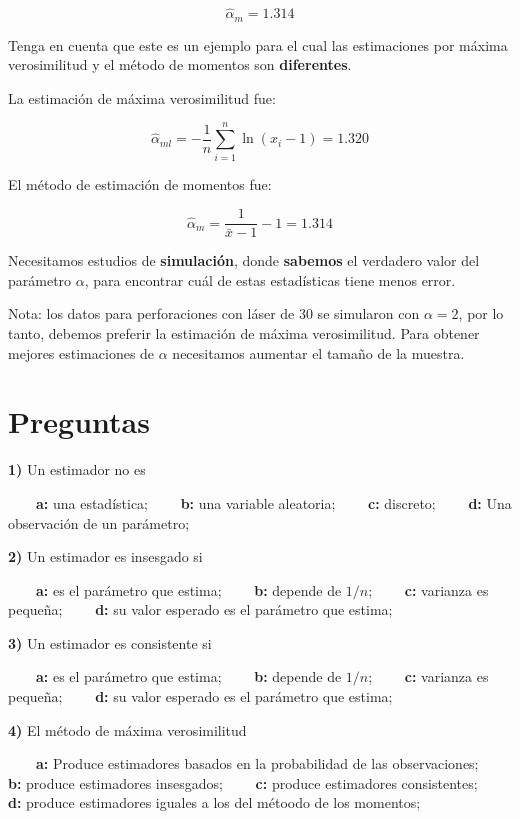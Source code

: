 \documentclass[
]{book}
\begin{document}
\[\hat{\alpha}_m=1.314\]

Tenga en cuenta que este es un ejemplo para el cual las estimaciones por máxima verosimilitud y el método de momentos son \textbf{diferentes}.

La estimación de máxima verosimilitud fue:

\[\hat{\alpha}_{ml}=-\frac{1}{n}\sum_{i=1}^n \ln (x_i-1)=1.320\]

El método de estimación de momentos fue:

\[\hat{\alpha}_m=\frac{1}{\bar{x}-1}-1=1.314\]

Necesitamos estudios de \textbf{simulación}, donde \textbf{sabemos} el verdadero valor del parámetro \(\alpha\), para encontrar cuál de estas estadísticas tiene menos error.

Nota: los datos para perforaciones con láser de \(30\) se simularon con \(\alpha=2\), por lo tanto, debemos preferir la estimación de máxima verosimilitud. Para obtener mejores estimaciones de \(\alpha\) necesitamos aumentar el tamaño de la muestra.

\hypertarget{preguntas-9}{%
\section{Preguntas}\label{preguntas-9}}

\textbf{1)} Un estimador no es

\textbf{\(\qquad\)a:} una estadística;
\textbf{\(\qquad\)b:} una variable aleatoria;
\textbf{\(\qquad\)c:} discreto;
\textbf{\(\qquad\)d:} Una observación de un parámetro;

\textbf{2)} Un estimador es insesgado si

\textbf{\(\qquad\)a:} es el parámetro que estima;
\textbf{\(\qquad\)b:} depende de \(1/n\);
\textbf{\(\qquad\)c:} varianza es pequeña;
\textbf{\(\qquad\)d:} su valor esperado es el parámetro que estima;

\textbf{3)} Un estimador es consistente si

\textbf{\(\qquad\)a:} es el parámetro que estima;
\textbf{\(\qquad\)b:} depende de \(1/n\);
\textbf{\(\qquad\)c:} varianza es pequeña;
\textbf{\(\qquad\)d:} su valor esperado es el parámetro que estima;

\textbf{4)} El método de máxima verosimilitud

\textbf{\(\qquad\)a:} Produce estimadores basados en la probabilidad de las observaciones;
\textbf{\(\qquad\)b:} produce estimadores insesgados;
\textbf{\(\qquad\)c:} produce estimadores consistentes;
\textbf{\(\qquad\)d:} produce estimadores iguales a los del métoodo de los momentos;
\end{document}
